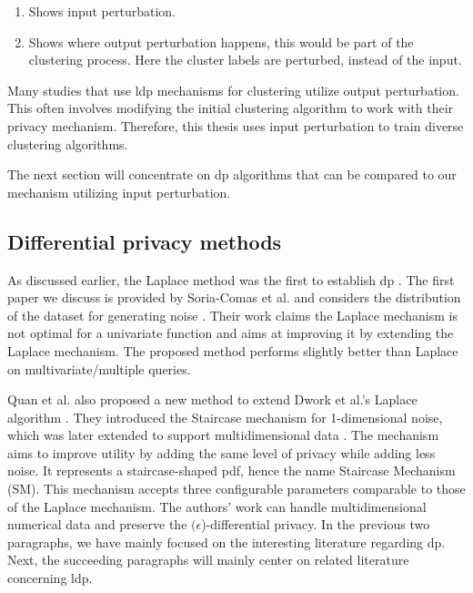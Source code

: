\begin{enumerate}
  \item Shows input perturbation.
  \item Shows where output perturbation happens, this would be part of the clustering process. Here the cluster labels are perturbed, instead of the input.
\end{enumerate}
Many studies that use \gls{ldp} mechanisms for clustering utilize output perturbation. 
This often involves modifying the initial clustering algorithm to work with their privacy mechanism. 
Therefore, this thesis uses input perturbation to train diverse clustering algorithms.

The next section will concentrate on \gls{dp} algorithms that can be compared to our mechanism utilizing input perturbation.
\newpage
\subsection{Differential privacy methods}
As discussed earlier, the Laplace method was the first to establish \gls{dp} \citep{dwork_differential_2006}.
The first paper we discuss is provided by Soria-Comas et al. and considers the distribution of the dataset for generating noise \citep{soria-comas_optimal_2013}.
Their work claims the Laplace mechanism is not optimal for a univariate function and aims at improving it by extending the Laplace mechanism.
The proposed method performs slightly better than Laplace on multivariate/multiple queries.

Quan et al. also proposed a new method to extend Dwork et al.'s Laplace algorithm \citep{geng_staircase_2015}.
They introduced the Staircase mechanism for 1-dimensional noise, which was later extended to support multidimensional data \citep{geng_staircase_2015}.
The mechanism aims to improve utility by adding the same level of privacy while adding less noise.
It represents a staircase-shaped \gls{pdf}, hence the name Staircase Mechanism (SM).
This mechanism accepts three configurable parameters comparable to those of the Laplace mechanism.
The authors' work can handle multidimensional numerical data and preserve the  $(\epsilon$)-differential privacy.
In the previous two paragraphs, we have mainly focused on the interesting literature regarding \gls{dp}. \newline
Next, the succeeding paragraphs will mainly center on related literature concerning \gls{ldp}. \newline

